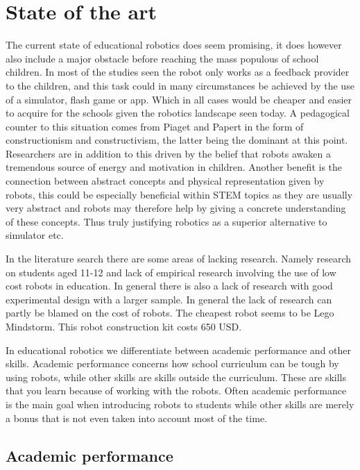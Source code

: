 \section*{State of the art}
The current state of educational robotics does seem promising, it does however also include a major obstacle before reaching the mass populous of school children.
In most of the studies seen the robot only works as a feedback provider to the children, and this task could in many circumstances be achieved by the use of 
a simulator, flash game or app. Which in all cases would be cheaper and easier to acquire for the schools given the robotics landscape seen today.
A pedagogical counter to this situation comes from Piaget and Papert in the form of constructionism and constructivism, the latter being the dominant at this point. 
Researchers are in addition to this driven by the belief that robots awaken a tremendous source of energy and motivation in children. 
Another benefit is the connection between abstract concepts and physical representation given by robots, this could be especially beneficial within STEM topics as 
they are usually very abstract and robots may therefore help by giving a concrete understanding of these concepts. 
Thus truly justifying robotics as a superior alternative to simulator etc. 

\bigskip\noindent
In the literature search there are some areas of lacking research. Namely research on students aged 11-12 and lack of empirical research involving the use of low cost robots in education. In general there is also a lack of research with good experimental design with a larger sample. In general the lack of research can partly be blamed on the cost of robots. The cheapest robot seems to be Lego Mindstorm. This robot construction kit costs 650 USD. 

\bigskip\noindent
In educational robotics we differentiate between academic performance and other skills. Academic performance concerns how school curriculum can be tough by using robots, while other skills are skills outside the curriculum. These are skills that you learn because of working with the robots. Often academic performance is the main goal when introducing robots to students while other skills are merely a bonus that is not even taken into account most of the time. 

\subsection*{Academic performance}

